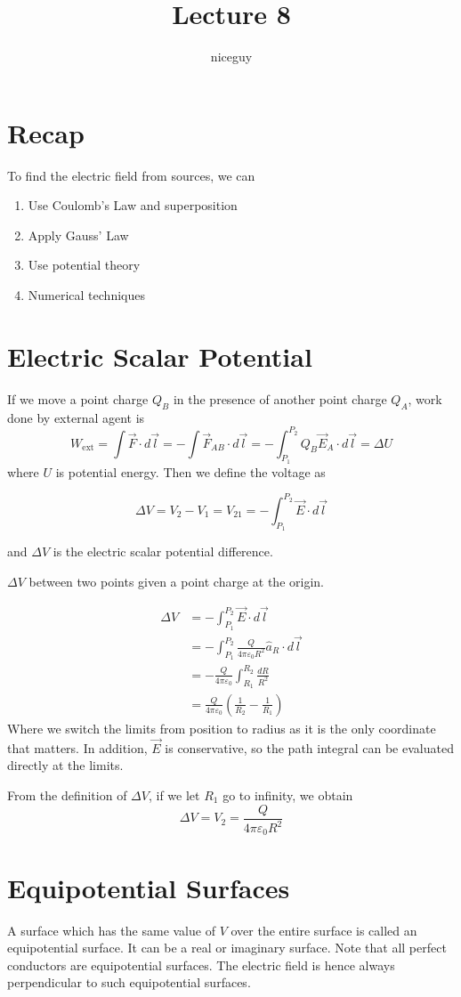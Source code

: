 \documentclass[12pt]{article}
\author{niceguy}
\title{Lecture 8}
\begin{document}
\maketitle

\section{Recap}

To find the electric field from sources, we can
\begin{enumerate}
	\item Use Coulomb's Law and superposition
	\item Apply Gauss' Law
	\item Use potential theory
	\item Numerical techniques
\end{enumerate}

\section{Electric Scalar Potential}

If we move a point charge $Q_B$ in the presence of another point charge $Q_A$, work done by external agent is
$$W_{\mathrm{ext}} = \int \vec{F}\cdot d\vec{l} = -\int\vec{F}_{AB}\cdot d\vec{l} = -\int_{P_1}^{P_2}Q_B\vec{E}_A\cdot d\vec{l} = \Delta U$$
where $U$ is potential energy. Then we define the voltage as

$$\Delta V = V_2 - V_1 = V_{21} = -\int_{P_1}^{P_2}\vec{E}\cdot d\vec{l}$$

and $\Delta V$ is the electric scalar potential difference.

\begin{ex}
	$\Delta V$ between two points given a point charge at the origin.

	\begin{align*}
		\Delta V &= -\int_{P_1}^{P_2}\vec{E}\cdot d\vec{l} \\
			 &= -\int_{P_1}^{P_2}\frac{Q}{4\pi\varepsilon_0R^2}\hat{a}_R\cdot d\vec{l} \\
			 &= -\frac{Q}{4\pi\varepsilon_0}\int_{R_1}^{R_2} \frac{dR}{R^2} \\
			 &= \frac{Q}{4\pi\varepsilon_0}\left(\frac{1}{R_2} - \frac{1}{R_1}\right)
	\end{align*}
	Where we switch the limits from position to radius as it is the only coordinate that matters. In addition, $\vec{E}$ is conservative, so the path integral can be evaluated directly at the limits.
\end{ex}

From the definition of $\Delta V$, if we let $R_1$ go to infinity, we obtain
$$\Delta V = V_2 = \frac{Q}{4\pi\varepsilon_0R^2}$$

\section{Equipotential Surfaces}

A surface which has the same value of $V$ over the entire surface is called an equipotential surface. It can be a real or imaginary surface. Note that all perfect conductors are equipotential surfaces. The electric field is hence always perpendicular to such equipotential surfaces.
\end{document}

